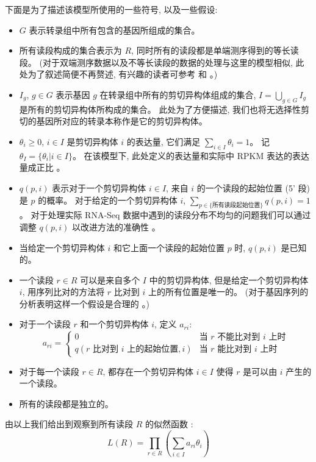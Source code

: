 下面是为了描述该模型所使用的一些符号, 以及一些假设: 
\begin{itemize}
\item $G$ 表示转录组中所有包含的基因所组成的集合。 

\item 所有读段构成的集合表示为 $R$, 同时所有的读段都是单端测序得到的等长读段。 
(对于双端测序数据以及不等长读段的数据的处理与这里的模型相似, 此处为了叙述简便不再赘述, 
有兴趣的读者可参考  和 。)

\item $I_g$, $g \in G$ 表示基因 $g$ 在转录组中所有的剪切异构体组成的集合, 
$I = \bigcup_{g \in G} I_g$ 是所有的剪切异构体所构成的集合。 
此处为了方便描述, 我们也将无选择性剪切的基因所对应的转录本称作是它的剪切异构体。 

\item $\theta_i \geq 0$, $i \in I$ 是剪切异构体 $i$ 的表达量, 
它们满足 $\sum_{i \in I} \theta_i = 1$。 记 $\theta_I = \{\theta_i | i \in I\}$。
在该模型下, 此处定义的表达量和实际中 RPKM 表达的表达量成正比 \cite{cufflinks.2010}。

\item $q(p, i)$ 表示对于一个剪切异构体 $i \in I$, 
来自 $i$ 的一个读段的起始位置 (5' 段) 是 $p$ 的概率。
对于给定的一个剪切异构体 $i$, 
$\sum_{p \in \{ \text{所有读段起始位置} \}} q(p, i) = 1$。
对于处理实际 RNA-Seq 数据中遇到的读段分布不均匀的问题我们可以通过调整 $q(p,i)$ 
以改进方法的准确性 \cite{roberts2011improving}。

\item 当给定一个剪切异构体 $i$ 和它上面一个读段的起始位置 $p$ 时, 
$q(p, i)$ 是已知的。

\item 一个读段 $r \in R$ 可以是来自多个 $I$ 中的剪切异构体, 
但是给定一个剪切异构体 $i$, 
用序列比对的方法将 $r$ 比对到 $i$ 上的所有位置是唯一的。 
(对于基因序列的分析表明这样一个假设是合理的 \cite{peng2011t}。) 

\item 对于一个读段 $r$ 和一个剪切异构体 $i$, 定义 $a_{ri}$: 
\[
a_{ri} = \begin{cases}
0 & \text{当 $r$ 不能比对到 $i$ 上时} \\
q(\text{$r$ 比对到 $i$ 上的起始位置},i) & \text{当 $r$ 能比对到 $i$ 上时} \end{cases}
\]

\item 对于每一个读段 $r \in R$, 
都存在一个剪切异构体 $i \in I$ 使得 $r$ 是可以由 $i$ 产生的一个读段。 

\item 所有的读段都是独立的。 
\end{itemize}
由以上我们给出到观察到所有读段 $R$ 的似然函数 \cite{2011arXiv1104.3889P}: 
\begin{equation}
\label{rna-seq-general-likelihood}
L(R) = \prod_{r \in R} (\sum_{i \in I} a_{ri} \theta_i)
\end{equation}

